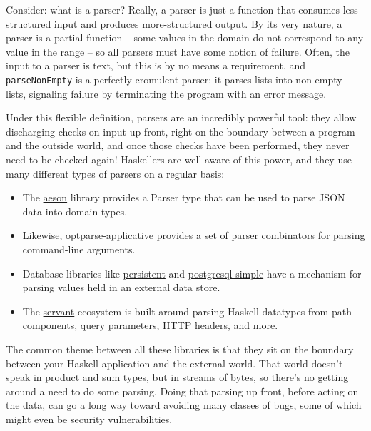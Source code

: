 Consider: what is a parser? Really, a parser is just a function that consumes less-structured input and produces more-structured output. By its very nature, a parser is a partial function -- some values in the domain do not correspond to any value in the range -- so all parsers must have some notion of failure. Often, the input to a parser is text, but this is by no means a requirement, and \texttt{parseNonEmpty} is a perfectly cromulent parser: it parses lists into non-empty lists, signaling failure by terminating the program with an error message.

Under this flexible definition, parsers are an incredibly powerful tool: they allow discharging checks on input up-front, right on the boundary between a program and the outside world, and once those checks have been performed, they never need to be checked again! Haskellers are well-aware of this power, and they use many different types of parsers on a regular basis:

\begin{itemize}
\item The \href{https://hackage.haskell.org/package/aeson}{aeson} library provides a Parser type that can be used to parse JSON data into domain types.

\item Likewise, \href{https://hackage.haskell.org/package/optparse-applicative}{optparse-applicative} provides a set of parser combinators for parsing command-line arguments.

\item Database libraries like \href{https://hackage.haskell.org/package/persistent}{persistent} and \href{https://hackage.haskell.org/package/postgresql-simple}{postgresql-simple} have a mechanism for parsing values held in an external data store.

\item The \href{https://hackage.haskell.org/package/servant}{servant} ecosystem is built around parsing Haskell datatypes from path components, query parameters, HTTP headers, and more.
\end{itemize}
The common theme between all these libraries is that they sit on the boundary between your Haskell application and the external world. That world doesn't speak in product and sum types, but in streams of bytes, so there's no getting around a need to do some parsing. Doing that parsing up front, before acting on the data, can go a long way toward avoiding many classes of bugs, some of which might even be security vulnerabilities.

